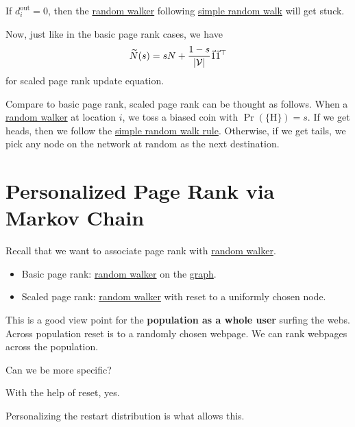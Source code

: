 \begin{note}
	If \(d_i^{\text{out}} = 0\), then the \hyperref[def:random-walker]{random walker} following \hyperref[def:simple-random-walk]{simple random walk} will get stuck.
\end{note}

Now, just like in the basic page rank cases, we have
\[
	\widetilde{N} (s) = s N + \frac{1-s}{\left\vert \mathcal{\MakeUppercase{v}}  \right\vert }\vec{1} \vec{1} ^{\top}
\]
for scaled page rank update equation.

\begin{intuition}
	Compare to basic page rank, scaled page rank can be thought as follows. When a \hyperref[def:random-walker]{random walker} at location \(i\), we toss a biased coin with \(\Pr(\{\mathrm{H} \}) = s\). If we get heads, then we follow the \hyperref[def:simple-random-walk]{simple random walk rule}. Otherwise, if we get tails, we pick any node on the network at random as the next destination.
\end{intuition}

\section{Personalized Page Rank via Markov Chain}
\begin{prev}
	Recall that we want to associate page rank with \hyperref[def:random-walker]{random walker}.
	\begin{itemize}
		\item Basic page rank: \hyperref[def:random-walker]{random walker} on the \hyperref[def:graph]{graph}.
		\item Scaled page rank: \hyperref[def:random-walker]{random walker} with reset to a uniformly chosen node.
	\end{itemize}
\end{prev}
This is a good view point for the \textbf{population as a whole user} surfing the webs. Across population reset is to a randomly chosen webpage. We can rank webpages across the population.

\begin{problem}
Can we be more specific?
\end{problem}
\begin{answer}
	With the help of reset, yes.
	\begin{remark}
		Personalizing the restart distribution is what allows this.
	\end{remark}
\end{answer}

